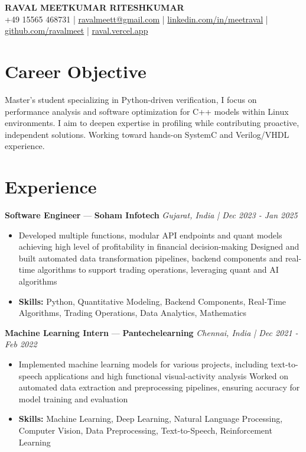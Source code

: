 \documentclass[a4paper,10pt]{article}
\begin{document}
\begin{center}
  {\Large\bfseries RAVAL MEETKUMAR RITESHKUMAR}\\[2pt]
  {\small +49 15565 468731 \;|\; \href{mailto:ravalmeett@gmail.com}{ravalmeett@gmail.com} \;|\; \href{https://www.linkedin.com/in/meetraval/}{linkedin.com/in/meetraval} \;|\; \href{https://github.com/ravalmeet}{github.com/ravalmeet} \;|\; \href{https://raval.vercel.app/}{raval.vercel.app}}
\end{center}
\vspace{-3pt}

\section*{Career Objective}
Master's student specializing in Python-driven verification, I focus on performance analysis and software optimization for C++ models within Linux environments. I aim to deepen expertise in profiling while contributing proactive, independent solutions. Working toward hands-on SystemC and Verilog/VHDL experience.\par

\section*{Experience}
\textbf{Software Engineer} — \textbf{Soham Infotech} \hfill \textit{Gujarat, India \;|\; Dec 2023 - Jan 2025}\par
\vspace{1pt}
\begin{itemize}
  \item Developed multiple functions, modular API endpoints and quant models achieving high level of profitability in financial decision-making Designed and built automated data transformation pipelines, backend components and real-time algorithms to support trading operations, leveraging quant and AI algorithms
  \item \textbf{Skills:} Python, Quantitative Modeling, Backend Components, Real-Time Algorithms, Trading Operations, Data Analytics, Mathematics
\end{itemize}
\vspace{3pt}
\textbf{Machine Learning Intern} — \textbf{Pantechelearning} \hfill \textit{Chennai, India \;|\; Dec 2021 - Feb 2022}\par
\vspace{1pt}
\begin{itemize}
  \item Implemented machine learning models for various projects, including text-to-speech applications and high functional visual-activity analysis Worked on automated data extraction and preprocessing pipelines, ensuring accuracy for model training and evaluation
  \item \textbf{Skills:} Machine Learning, Deep Learning, Natural Language Processing, Computer Vision, Data Preprocessing, Text-to-Speech, Reinforcement Learning
\end{itemize}
\end{document}
